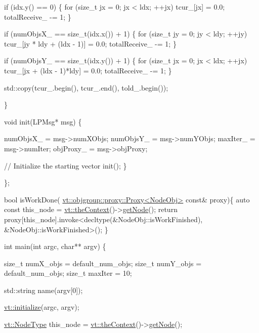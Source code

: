 \begin{DoxyCodeInclude}
    \textcolor{keywordflow}{if} (idx.y() == 0) \{
      \textcolor{keywordflow}{for} (\textcolor{keywordtype}{size\_t} jx = 0; jx < ldx; ++jx)
        tcur\_[jx] = 0.0;
      totalReceive\_ -= 1;
    \}

    \textcolor{keywordflow}{if} (numObjsX\_ == \textcolor{keywordtype}{size\_t}(idx.x()) + 1) \{
      \textcolor{keywordflow}{for} (\textcolor{keywordtype}{size\_t} jy = 0; jy < ldy; ++jy)
        tcur\_[jy * ldy + (ldx - 1)] = 0.0;
      totalReceive\_ -= 1;
    \}

    \textcolor{keywordflow}{if} (numObjsY\_ == \textcolor{keywordtype}{size\_t}(idx.y()) + 1) \{
      \textcolor{keywordflow}{for} (\textcolor{keywordtype}{size\_t} jx = 0; jx < ldx; ++jx)
        tcur\_[jx + (ldx - 1)*ldy] = 0.0;
      totalReceive\_ -= 1;
    \}

    std::copy(tcur\_.begin(), tcur\_.end(), told\_.begin());

  \}


  \textcolor{keywordtype}{void} init(LPMsg* msg) \{

    numObjsX\_ = msg->numXObjs;
    numObjsY\_ = msg->numYObjs;
    maxIter\_ = msg->numIter;
    objProxy\_ = msg->objProxy;

    \textcolor{comment}{// Initialize the starting vector}
    init();
  \}

\};

\textcolor{keywordtype}{bool} isWorkDone( \hyperlink{structvt_1_1objgroup_1_1proxy_1_1_proxy}{vt::objgroup::proxy::Proxy<NodeObj>} \textcolor{keyword}{const}& proxy)\{
  \textcolor{keyword}{auto} \textcolor{keyword}{const} this\_node = \hyperlink{namespacevt_a26551fe0e6e6a1371111df5b12c7e92c}{vt::theContext}()->\hyperlink{structvt_1_1ctx_1_1_context_a0d52c263ce8516546a67443d9a86fa5f}{getNode}();
  \textcolor{keywordflow}{return} proxy[this\_node].invoke<decltype(&NodeObj::isWorkFinished), &NodeObj::isWorkFinished>();
\}

\textcolor{keywordtype}{int} main(\textcolor{keywordtype}{int} argc, \textcolor{keywordtype}{char}** argv) \{

  \textcolor{keywordtype}{size\_t} numX\_objs = default\_num\_objs;
  \textcolor{keywordtype}{size\_t} numY\_objs = default\_num\_objs;
  \textcolor{keywordtype}{size\_t} maxIter = 10;

  std::string name(argv[0]);

  \hyperlink{namespacevt_aaa266774ea8339c58be0202b00fafa62}{vt::initialize}(argc, argv);

  \hyperlink{namespacevt_a866da9d0efc19c0a1ce79e9e492f47e2}{vt::NodeType} this\_node = \hyperlink{namespacevt_a26551fe0e6e6a1371111df5b12c7e92c}{vt::theContext}()->\hyperlink{structvt_1_1ctx_1_1_context_a0d52c263ce8516546a67443d9a86fa5f}{getNode}();


\end{DoxyCodeInclude}
